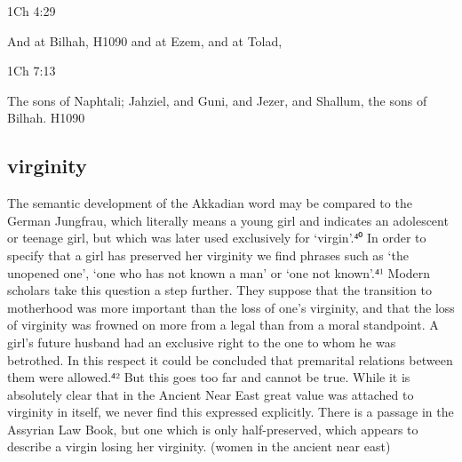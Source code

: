 \documentclass[11pt]{article}
\begin{document}
{1Ch 4:29

And at Bilhah, H1090 and at Ezem, and at Tolad,


1Ch 7:13

The sons of Naphtali; Jahziel, and Guni, and Jezer, and Shallum, the sons of Bilhah. H1090

\subsection{virginity}

The semantic development of the Akkadian word may be compared to the German Jungfrau, which literally means a young girl and indicates an adolescent or teenage girl, but which
was later used exclusively for ‘virgin’.⁴⁰ In order to specify that a girl has preserved her virginity we find phrases such as ‘the unopened one’, ‘one who has not
known a man’ or ‘one not known’.⁴¹
Modern scholars take this question a step further. They suppose that the transition to motherhood was more important than the loss of one’s virginity, and
that the loss of virginity was frowned on more from a legal than from a moral
standpoint. A girl’s future husband had an exclusive right to the one to whom
he was betrothed. In this respect it could be concluded that premarital relations
between them were allowed.⁴² But this goes too far and cannot be true. While
it is absolutely clear that in the Ancient Near East great value was attached to
virginity in itself, we never find this expressed explicitly. There is a passage in
the Assyrian Law Book, but one which is only half-preserved, which appears to
describe a virgin losing her virginity.
(women in the ancient near east)


}
\end{document}
